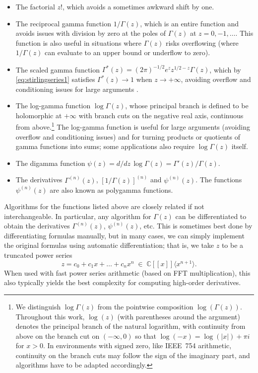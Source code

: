 \documentclass[reqno]{amsart}
\newcommand{\CC}{\mathbb{C}}
\theoremstyle{definition}
\begin{document}
\begin{itemize}
\item The factorial $z!$, which avoids a sometimes awkward shift by one.
\item The reciprocal gamma function $1 / \Gamma(z)$, which is an entire function and avoids issues with division by zero at the poles of $\Gamma(z)$ at $z = 0, -1, \ldots$.
This function is also useful in situations where $\Gamma(z)$ risks overflowing (where $1 / \Gamma(z)$ can evaluate to an upper bound or underflow to zero).
\item The scaled gamma function $\Gamma^{*}(z) = (2 \pi)^{-1/2} e^z {z}^{1/2-z} \Gamma(z)$, which by \eqref{eq:stirlingseries1} satisfies $\Gamma^{*}(z) \to 1$ when $z \to +\infty$, avoiding overflow and conditioning issues for large arguments \cite{gil2007numerical,Nemes2015}.
\item The log-gamma function $\log \Gamma(z)$, whose principal branch is defined to be holomorphic at $+\infty$ with branch cuts on the negative real axis, continuous from above.\footnote{We distinguish $\log \Gamma(z)$ from the pointwise composition $\log(\Gamma(z))$. Throughout this work, $\log(z)$ (with parentheses around the argument) denotes the principal branch of the natural logarithm, with continuity from above on the branch cut on $(-\infty, 0)$ so that $\log(-x) = \log(|x|) + \pi i$ for $x > 0$. In environments with signed zero, like IEEE~754 arithmetic, continuity on the branch cuts may follow the sign of the imaginary part, and algorithms have to be adapted accordingly.} The log-gamma function is useful for large arguments (avoiding overflow and conditioning issues) and for turning products or quotients of gamma functions into sums; some applications also require $\log \Gamma(z)$ itself.
\item The digamma function $\psi(z) = d/dz \, \log \Gamma(z) = \Gamma'(z) / \Gamma(z)$.
\item The derivatives $\Gamma^{(n)}(z)$, $[1/\Gamma(z)]^{(n)}$ and $\psi^{(n)}(z)$. The functions $\psi^{(n)}(z)$ are also known as polygamma functions.
\end{itemize}

Algorithms for the functions listed above are closely related
if not interchangeable.
In particular, any algorithm for $\Gamma(z)$ can be differentiated
to obtain the derivatives $\Gamma^{(n)}(z)$, $\psi^{(n)}(z)$, etc.
This is sometimes best done by differentiating formulas manually,
but in many cases, we can simply implement the original formulas
using automatic differentiation; that is, we take $z$
to be a truncated power series
\begin{equation}
z = c_0 + c_1 x + \ldots + c_n x^n \; \in \; \CC[[x]] \langle x^{n+1} \rangle.
\end{equation}
When used with fast power series arithmetic (based on FFT multiplication),
this also typically yields the best complexity for computing
high-order derivatives.
\end{document}

